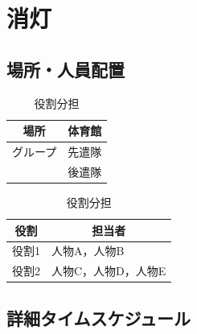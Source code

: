 \newpage

\section{消灯}

\subsection{場所・人員配置}
\begin{table}[h]
  \centering
  \begin{minipage}[t]{0.48\columnwidth}
    \centering
    \caption{場所・該当グループ}
    \begin{tabular}{cl}
      \hline
      場所 & 体育館 \\
      \hline
      グループ & 先遣隊 \\
       & 後遣隊 \\
      \hline
    \end{tabular}
  \end{minipage}
  \begin{minipage}[t]{0.48\columnwidth}
    \centering
    \caption{役割分担}
    \begin{tabular}{ll}
      \hline
      \multicolumn{1}{c}{役割} & \multicolumn{1}{c}{担当者} \\
      \hline
      役割1 & 人物A，人物B \\
      役割2 & 人物C，人物D，人物E \\
      \hline
    \end{tabular}
  \end{minipage}
\end{table}

\subsection{詳細タイムスケジュール}
\vspace{0.5em}
\fontsize{8pt}{12pt}\selectfont

